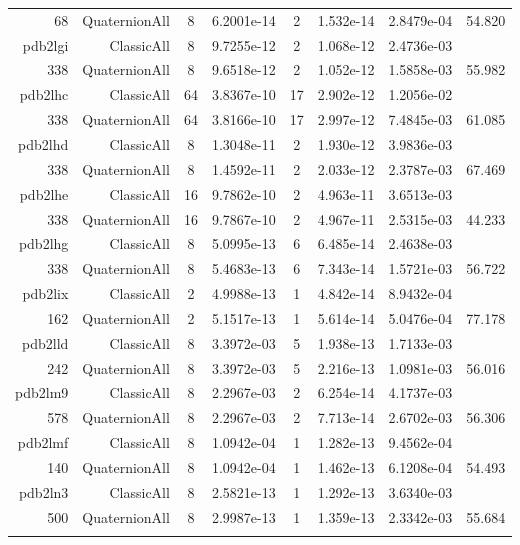 \begin{xltabular}{\textwidth}{r|rcS[table-format=1.4e+2]cS[table-format=1.3e+2]S[table-format=1.4e+2]S[table-format=-1.3]}
68 & QuaternionAll & 8 & 6.2001e-14 & 2 & 1.532e-14 & 2.8479e-04 & 54.820\\  \addlinespace
pdb2lgi & ClassicAll & 8 & 9.7255e-12 & 2 & 1.068e-12 & 2.4736e-03 & \\
338 & QuaternionAll & 8 & 9.6518e-12 & 2 & 1.052e-12 & 1.5858e-03 & 55.982\\  \addlinespace
pdb2lhc & ClassicAll & 64 & 3.8367e-10 & 17 & 2.902e-12 & 1.2056e-02 & \\
338 & QuaternionAll & 64 & 3.8166e-10 & 17 & 2.997e-12 & 7.4845e-03 & 61.085\\  \addlinespace
pdb2lhd & ClassicAll & 8 & 1.3048e-11 & 2 & 1.930e-12 & 3.9836e-03 & \\
338 & QuaternionAll & 8 & 1.4592e-11 & 2 & 2.033e-12 & 2.3787e-03 & 67.469\\  \addlinespace
pdb2lhe & ClassicAll & 16 & 9.7862e-10 & 2 & 4.963e-11 & 3.6513e-03 & \\
338 & QuaternionAll & 16 & 9.7867e-10 & 2 & 4.967e-11 & 2.5315e-03 & 44.233\\  \addlinespace
pdb2lhg & ClassicAll & 8 & 5.0995e-13 & 6 & 6.485e-14 & 2.4638e-03 & \\
338 & QuaternionAll & 8 & 5.4683e-13 & 6 & 7.343e-14 & 1.5721e-03 & 56.722\\  \addlinespace
pdb2lix & ClassicAll & 2 & 4.9988e-13 & 1 & 4.842e-14 & 8.9432e-04 & \\
162 & QuaternionAll & 2 & 5.1517e-13 & 1 & 5.614e-14 & 5.0476e-04 & 77.178\\  \addlinespace
pdb2lld & ClassicAll & 8 & 3.3972e-03 & 5 & 1.938e-13 & 1.7133e-03 & \\
242 & QuaternionAll & 8 & 3.3972e-03 & 5 & 2.216e-13 & 1.0981e-03 & 56.016\\  \addlinespace
pdb2lm9 & ClassicAll & 8 & 2.2967e-03 & 2 & 6.254e-14 & 4.1737e-03 & \\
578 & QuaternionAll & 8 & 2.2967e-03 & 2 & 7.713e-14 & 2.6702e-03 & 56.306\\  \addlinespace
pdb2lmf & ClassicAll & 8 & 1.0942e-04 & 1 & 1.282e-13 & 9.4562e-04 & \\
140 & QuaternionAll & 8 & 1.0942e-04 & 1 & 1.462e-13 & 6.1208e-04 & 54.493\\  \addlinespace
pdb2ln3 & ClassicAll & 8 & 2.5821e-13 & 1 & 1.292e-13 & 3.6340e-03 & \\
500 & QuaternionAll & 8 & 2.9987e-13 & 1 & 1.359e-13 & 2.3342e-03 & 55.684\\  \addlinespace

\end{xltabular}
